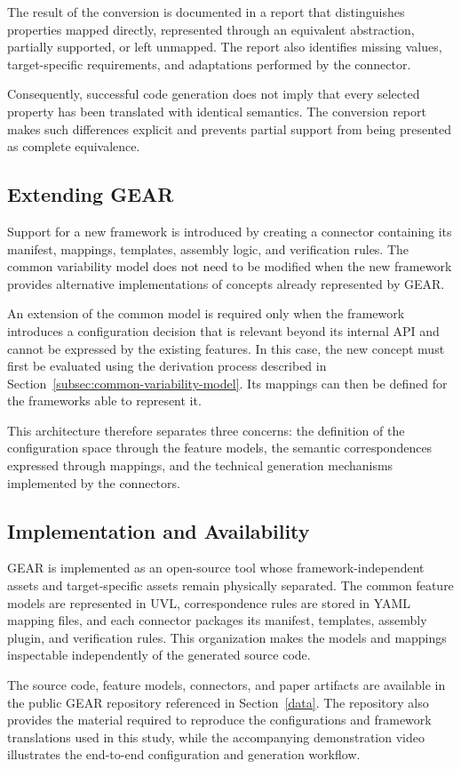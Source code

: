 The result of the conversion is documented in a report that distinguishes
properties mapped directly, represented through an equivalent abstraction,
partially supported, or left unmapped. The report also identifies missing
values, target-specific requirements, and adaptations performed by the
connector.

Consequently, successful code generation does not imply that every selected
property has been translated with identical semantics. The conversion report
makes such differences explicit and prevents partial support from being
presented as complete equivalence.

\subsection{Extending GEAR}
\label{subsec:extending-gear}

Support for a new framework is introduced by creating a connector containing
its manifest, mappings, templates, assembly logic, and verification rules. The
common variability model does not need to be modified when the new framework
provides alternative implementations of concepts already represented by GEAR.

An extension of the common model is required only when the framework introduces
a configuration decision that is relevant beyond its internal API and cannot be
expressed by the existing features. In this case, the new concept must first be
evaluated using the derivation process described in
Section~\ref{subsec:common-variability-model}. Its mappings can then be defined
for the frameworks able to represent it.

This architecture therefore separates three concerns: the definition of the
configuration space through the feature models, the semantic correspondences
expressed through mappings, and the technical generation mechanisms implemented
by the connectors.

\subsection{Implementation and Availability}
\label{subsec:implementation-availability}

GEAR is implemented as an open-source tool whose framework-independent assets
and target-specific assets remain physically separated. The common feature
models are represented in UVL, correspondence rules are stored in YAML mapping
files, and each connector packages its manifest, templates, assembly plugin,
and verification rules. This organization makes the models and mappings
inspectable independently of the generated source code.

The source code, feature models, connectors, and paper artifacts are available
in the public GEAR repository referenced in Section~\ref{data}. The repository
also provides the material required to reproduce the configurations and
framework translations used in this study, while the accompanying demonstration
video illustrates the end-to-end configuration and generation workflow.
